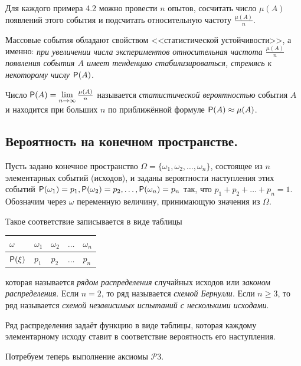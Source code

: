 Для каждого примера 4.2 можно провести $n$ опытов, сосчитать число $\mu(A)$ появлений этого события и подсчитать относительную частоту $\frac{\mu(A)}{n}$.

Массовые события обладают свойством <<статистической устойчивости>>, а именно: \textit{при увеличении числа экспериментов относительная частота $\frac{\mu(A)}{n}$
появления события $A$ имеет тенденцию стабилизироваться, стремясь к некоторому числу $\P(A)$.}
\begin{definition}
	\label{def:4.4}
Число $\P(A) = \lim\limits_{n\to\infty} \frac{\mu(A)}{n}$ называется \textit{статистической вероятностью} события $A$ и находится при больших $n$ по приближённой формуле $\P(A)\approx \mu(A)$.
\end{definition} 

\subsection{Вероятность на конечном пространстве.}
Пусть задано конечное пространство $\Omega=\{\omega_1,\omega_2,\ldots,\omega_n\}$, состоящее из $n$ элементарных событий (исходов), и заданы вероятности наступления этих
событий $\P(\omega_1 ) = p_1 , \P(\omega_2 ) = p_2 , \ldots , \P(\omega_n ) = p_n$ так, что $p_1 + p_2 + \ldots + p_n = 1$.
Обозначим через $\omega$ переменную величину, принимающую значения из $\Omega$.

\begin{definition}
	\label{def:4.5}
Такое соответствие записывается в виде таблицы
\begin{center}
	\begin{tabular}{|l|l|l|l|l|}
		\hline
		$\omega$ & $\omega_1$ & $\omega_2$ & $\ldots$ & $\omega_n$ \\ \hline
		$\P(\xi)$  & $p_1$ & $p_2$ & $\ldots$  & $p_n$ \\ \hline
	\end{tabular}
\end{center}


которая называется \textit{рядом распределения} случайных исходов или \textit{законом
распределения}. Если $n = 2$, то ряд называется \textit{схемой Бернулли}. Если $n \geq 3$,
то ряд называется \textit{схемой независимых испытаний с несколькими исходами}.
\end{definition}

Ряд распределения задаёт функцию в виде таблицы, которая каждому элементарному исходу ставит в соответствие вероятность его наступления.

Потребуем теперь выполнение аксиомы $\mathcal{P}3$.


